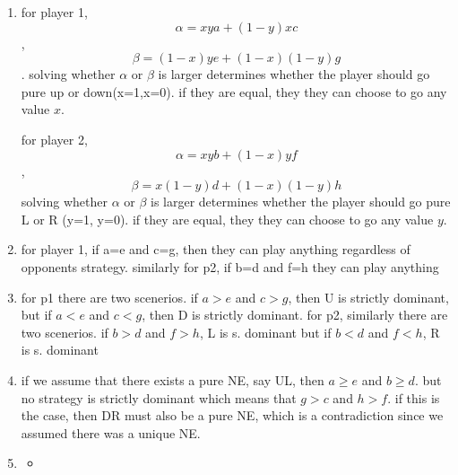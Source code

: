 \documentclass{article}
\begin{document}
\begin{enumerate}
    \item for player 1, \begin{equation}
        \alpha=xya + (1-y)xc
    \end{equation}, \begin{equation}
        \beta=(1-x)ye + (1-x)(1-y)g
    \end{equation}. solving whether \(\alpha\) or \(\beta\) is larger determines whether the player should go pure up or down(x=1,x=0). if they are equal, they they can choose to go any value \(x\).
    
    for player 2, \begin{equation}
        \alpha=xyb + (1-x)yf
    \end{equation}, 
    \begin{equation}
        \beta=x(1-y)d + (1-x)(1-y)h
    \end{equation}
    solving whether \(\alpha\) or \(\beta\) is larger determines whether the player should go pure L or R (y=1, y=0). if they are equal, they they can choose to go any value \(y\).
    \item for player 1, if a=e and c=g, then they can play anything regardless of opponents strategy. similarly for p2, if b=d and f=h they can play anything
    \item for p1 there are two scenerios. if \(a>e\) and \(c>g\), then U is strictly dominant, but  if \(a<e\) and \(c<g\), then D is strictly dominant. for p2, similarly there are two scenerios. if \(b>d\) and \(f>h\), L is s. dominant but if \(b<d\) and \(f<h\), R is s. dominant 
    \item if we assume that there exists a pure NE, say UL, then \(a\geq e\) and \(b\geq d\). but  no strategy is strictly dominant which means that \(g>c\) and \(h>f\). if this is the case, then DR must also be a pure NE, which is a contradiction since we assumed there was a unique NE. 
    \item \begin{itemize}
        \item ~\\
        

\end{itemize}
\end{enumerate}
\end{document}
